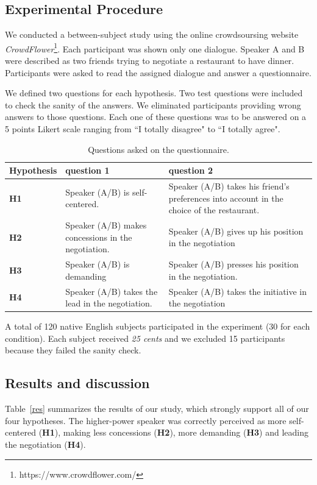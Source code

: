\documentclass{llncs}
\begin{document}
		
		\subsection{Experimental Procedure}
		
		We conducted a between-subject study using the online crowdsoursing website \emph{CrowdFlower}\footnote{https://www.crowdflower.com/}. 
		Each participant was shown only one dialogue. Speaker A and B were described as two friends trying to negotiate a restaurant to have dinner. %
		Participants were asked to read the assigned dialogue and answer a questionnaire. 
		
		We defined two questions for each hypothesis. Two test questions were included to check the	sanity of the answers. We eliminated participants providing wrong answers to those questions. Each one of these questions was to be answered on a 5 points Likert scale ranging from ``I totally disagree" to ``I totally agree".
		
		\begin{table}[t]
			{\scriptsize
				\begin{tabular}{|p{1.75cm}|p{5cm}|p{5.5cm}|}
					\hline
					Hypothesis &question 1& question 2 \\
					\hline
					\textbf{H1} &Speaker (A/B) is self-centered. &Speaker (A/B) takes his friend's preferences into account in the choice of the restaurant.\\
					\hline
					\textbf{H2} &Speaker (A/B) makes concessions in the negotiation.&Speaker (A/B) gives up his position in the negotiation\\
					\hline
					\textbf{H3} & Speaker (A/B) is demanding&Speaker (A/B) presses his position in the negotiation. \\
					\hline
					\textbf{H4} &Speaker (A/B) takes the lead in the negotiation.&Speaker (A/B) takes the initiative in the negotiation \\
					\hline
				\end{tabular}
			}
			\caption{Questions asked on the questionnaire.}
			\label{table:questionnaire}
		\end{table}
		
		A total of 120 native English subjects participated in the experiment (30 for each condition). Each subject received \textit{25 cents} and we excluded 15 participants because they failed the sanity check.
		
		\subsection{Results and discussion}
		\vspace{-.5em} 
		Table~\ref{res} summarizes the results of our study, which strongly support all of our four hypotheses.  The higher-power speaker was correctly perceived as more self-centered (\textbf{H1}), making less concessions (\textbf{H2}), more demanding (\textbf{H3}) and leading the negotiation (\textbf{H4}).
		
\end{document}

